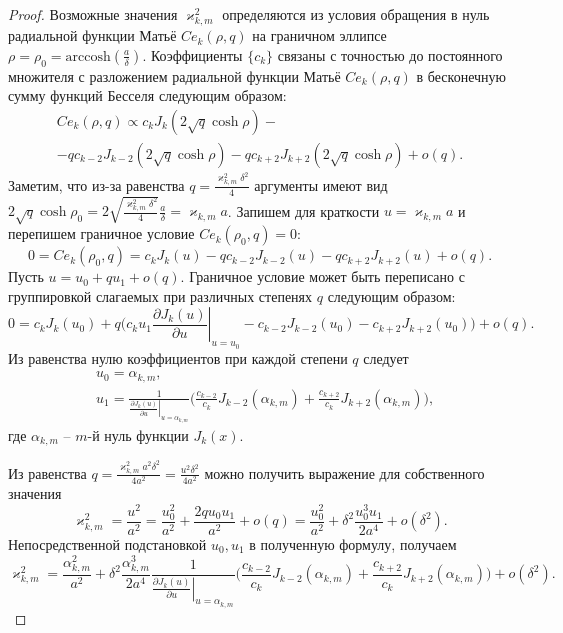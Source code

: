 \begin{proof}
Возможные значения $\varkappa_{k,m}^2$ определяются из условия обращения в нуль радиальной функции Матьё $Ce_k(\rho, q)$ на граничном эллипсе $\rho = \rho_0 = \text{arccosh} (\frac{a}{\delta})$.
Коэффициенты $\{c_k\}$ связаны \cite{wref2} с точностью до постоянного множителя с разложением радиальной функции Матьё $Ce_k(\rho, q)$ в бесконечную сумму функций Бесселя следующим образом:
\begin{multline*}
Ce_k(\rho, q) \propto 
	c_k J_k(2\sqrt{q}\cosh{\rho}) - \\
	- q c_{k-2} J_{k-2}(2\sqrt{q}\cosh{\rho}) -
	q c_{k+2} J_{k+2}(2\sqrt{q}\cosh{\rho}) + o(q).
\end{multline*}
Заметим, что из-за равенства $q = \frac{\varkappa_{k,m}^2\delta^2}{4}$ аргументы имеют вид $2 \sqrt{q} \cosh{\rho_0} = 2 \sqrt{\frac{\varkappa_{k,m}^2 \delta^2}{4}} \frac{a}{\delta} = \varkappa_{k,m} a$. 
Запишем для краткости $u = \varkappa_{k,m} a$ и перепишем граничное условие $Ce_k(\rho_0, q) = 0$:
$$0 = Ce_k(\rho_0, q) =
	c_k J_k(u) 
	- q c_{k-2} J_{k-2}(u) -
	q c_{k+2} J_{k+2}(u) + o(q).$$
Пусть $u = u_0 + q u_1 + o(q)$. Граничное условие может быть переписано с группировкой слагаемых при различных степенях $q$ следующим образом:
$$0 =
	c_k J_k(u_0) + q \biggl(
	c_k u_1 \left.\frac{\partial  J_k(u)}{\partial u}\right|_{u=u_0}
	-  c_{k-2} J_{k-2}(u_0) - c_{k+2} J_{k+2}(u_0) 
	\biggr)+ o(q).$$
Из равенства нулю коэффициентов при каждой степени $q$ следует
\begin{align*}
&u_0 = \alpha_{k, m}, \\
&u_1 = \frac{1}{\left.\frac{\partial J_{k} (u)}{\partial u}\right|_{u=\alpha_{k, m}}} 
\biggl(
\frac{c_{k-2}}{c_k} J_{k-2}(\alpha_{k, m}) + \frac{c_{k+2} }{c_k} J_{k+2}(\alpha_{k, m})
\biggr),
\end{align*}
где $\alpha_{k, m}$ -- $m$-й нуль функции $J_k(x)$.  

Из равенства $q=\frac{\varkappa_{k,m}^2 a^2 \delta^2}{4 a^2}=\frac{u^2 \delta^2}{4a^2}$ можно получить выражение для собственного значения
$$\varkappa_{k, m}^2 = \frac{u^2}{a^2} = \frac{u_0^2}{a^2} + \frac{2 q u_0 u_1}{a^2} + o(q)= \frac{u_0^2}{a^2} +  \delta^2 \frac{u_0^3 u_1}{2 a^4} + o(\delta^2).$$ 
Непосредственной подстановкой $u_0, u_1$ в полученную формулу, получаем
$$\varkappa_{k, m}^2 = 
\frac{\alpha_{k, m}^2}{a^2} +  \delta^2 \frac{\alpha_{k, m}^3}{2 a^4}\frac{1}{\left.\frac{\partial J_{k} (u)}{\partial u}\right|_{u=\alpha_{k, m}}} 
\biggl(
\frac{c_{k-2}}{c_k} J_{k-2}(\alpha_{k, m}) + \frac{c_{k+2} }{c_k} J_{k+2}(\alpha_{k, m})
\biggr) + o(\delta^2).
$$ 
\end{proof}

